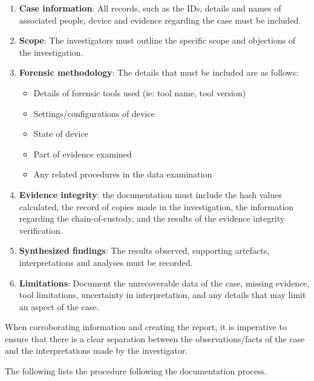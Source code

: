 \documentclass[a4paper]{report}
\begin{document}
\begin{justify}
\begin{enumerate}
    \item \textbf{Case information}: All records, such as the IDs, details and names of associated people, device and evidence regarding the case must be included.
    \item \textbf{Scope}: The investigators must outline the specific scope and objections of the investigation.
    \item \textbf{Forensic methodology}: The details that must be included are as follows: 
    \begin{itemize}
        \item Details of forensic tools used (ie: tool name, tool version)
        \item Settings/configurations of device
        \item State of device
        \item Part of evidence examined
        \item Any related procedures in the data examination 
    \end{itemize}
    \item \textbf{Evidence integrity}: the documentation must include the hash values calculated, the record of copies made in the investigation, the information regarding the chain-of-custody, and the results of the evidence integrity verification. 
    \item \textbf{Synthesized findings}: The results observed, supporting artefacts, interpretations and analyses must be recorded.
    \item \textbf{Limitations}: Document the unrecoverable data of the case, missing evidence, tool limitations, uncertainty in interpretation, and any details that may limit an aspect of the case. 
\end{enumerate}

When corroborating information and creating the report, it is imperative to ensure that there is a clear separation between the observations/facts of the case and the interpretations made by the investigator. 

The following lists the procedure following the documentation process.



\end{justify}
\end{document}
